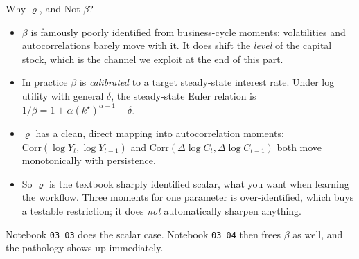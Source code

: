 \documentclass[aspectratio=169,11pt]{beamer}
\newcommand{\emphc}[1]{\textcolor{harvardcrimson}{#1}}
\begin{document}
\begin{frame}{Why $\varrho$, and Not $\beta$?}
\small
\begin{itemize}\itemsep3pt
  \item $\beta$ is famously \emphc{poorly identified from business-cycle moments}: volatilities and autocorrelations barely move with it. It does shift the \emph{level} of the capital stock, which is the channel we exploit at the end of this part.
  \item In practice $\beta$ is \emph{calibrated} to a target steady-state interest rate. Under log utility with general $\delta$, the steady-state Euler relation is $1/\beta = 1 + \alpha (k^\star)^{\alpha-1} - \delta$.
  \item $\varrho$ has a \emphc{clean, direct mapping} into autocorrelation moments: $\mathrm{Corr}(\log Y_t, \log Y_{t-1})$ and $\mathrm{Corr}(\Delta \log C_t, \Delta \log C_{t-1})$ both move monotonically with persistence.
  \item So $\varrho$ is the textbook \emphc{sharply identified} scalar, what you want when learning the workflow. Three moments for one parameter is over-identified, which buys a testable restriction; it does \emph{not} automatically sharpen anything.
\end{itemize}

\vspace{0.2cm}
Notebook \texttt{03\_03} does the scalar case. Notebook \texttt{03\_04} then frees $\beta$ as well, and the pathology shows up immediately.
\end{frame}
\end{document}
